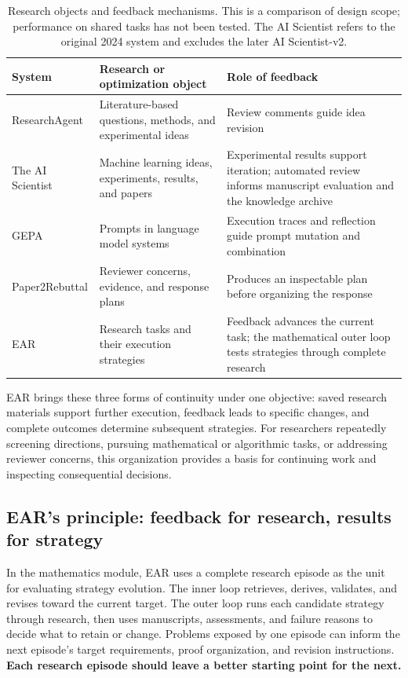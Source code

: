 \begin{table}[!htbp]
\centering\small
\begin{tabularx}{\textwidth}{P{31mm}Y Y}
\toprule
{}
\textbf{System} & \textbf{Research or optimization object} & \textbf{Role of feedback}\\
\midrule
ResearchAgent & Literature-based questions, methods, and experimental ideas & Review comments guide idea revision\\
The AI Scientist & Machine learning ideas, experiments, results, and papers & Experimental results support iteration; automated review informs manuscript evaluation and the knowledge archive\\
GEPA & Prompts in language model systems & Execution traces and reflection guide prompt mutation and combination\\
Paper2Rebuttal & Reviewer concerns, evidence, and response plans & Produces an inspectable plan before organizing the response\\
EAR & Research tasks and their execution strategies & Feedback advances the current task; the mathematical outer loop tests strategies through complete research\\
\bottomrule
\end{tabularx}
\caption{Research objects and feedback mechanisms. This is a comparison of design scope; performance on shared tasks has not been tested. The AI Scientist refers to the original 2024 system and excludes the later AI Scientist-v2.}
\label{tab:position}
\end{table}

EAR brings these three forms of continuity under one objective: saved research materials support further execution, feedback leads to specific changes, and complete outcomes determine subsequent strategies. For researchers repeatedly screening directions, pursuing mathematical or algorithmic tasks, or addressing reviewer concerns, this organization provides a basis for continuing work and inspecting consequential decisions.

\FloatBarrier
\subsection{EAR's principle: feedback for research, results for strategy}
\label{sec:contributions}
In the mathematics module, EAR uses a complete research episode as the unit for evaluating strategy evolution. The inner loop retrieves, derives, validates, and revises toward the current target. The outer loop runs each candidate strategy through research, then uses manuscripts, assessments, and failure reasons to decide what to retain or change. Problems exposed by one episode can inform the next episode's target requirements, proof organization, and revision instructions. \textbf{Each research episode should leave a better starting point for the next.}

